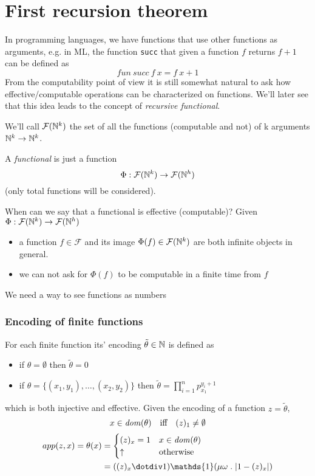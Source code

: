 \chapter{First recursion theorem}

In programming languages, we have functions that use other functions as arguments,
e.g. in ML, the function \texttt{succ} that
given a function $f$ returns $f+1$ can be defined as
\begin{equation*}
    fun\ succ\ f\ x = f\ x + 1
\end{equation*}
From the computability point of view it is still somewhat natural to ask
how effective/computable operations can be characterized on
functions. We'll later see that this idea leads to the concept of
\emph{recursive functional}.

\begin{definition}
  We'll call $\mathcal{F}(\mathbb{N}^k)$ the set of all the functions
  (computable and not) of k arguments $\mathbb{N}^k \to \mathbb{N}^k$.

A \emph{functional} is just a function
\[
  \Phi : \mathcal{F}(\mathbb{N}^k) \to \mathcal{F}(\mathbb{N}^h)
\]
(only total functions will be considered).
\end{definition}

When can we say that a functional is effective (computable)?
Given $\Phi : \mathcal{F}(\mathbb{N}^k) \to \mathcal{F}(\mathbb{N}^h)$
\begin{itemize}
\item a function $f \in \mathcal{F}$ and its image
  $\Phi(f) \in \mathcal{F}(\mathbb{N}^k)$ are both infinite objects in
  general.
\item we can not ask for $\Phi(f)$ to be computable in a finite time
  from $f$
\end{itemize}
We need a way to see functions as numbers
\subsection{Encoding of finite functions}
For each finite function its' encoding $\tilde{\theta} \in \mathbb{N}$ is defined
as
\begin{itemize}
\item if $\theta = \emptyset$ then $\tilde{\theta} = 0$
\item if $\theta = \{(x_1, y_1), \dots, (x_2, y_2)\}$ then
  $\tilde{\theta} = \prod_{i=1}^n p_{x_1}^{y_i+1}$
\end{itemize}
which is both injective and effective. Given the encoding of a function
$z= \tilde{\theta}$,
\[
  x \in \mathit{dom}({\theta}) \quad \mbox{iff} \quad (z)_1 \neq \emptyset
\]
\[
  \begin{aligned}
    app(z,x) = \theta(x) & = \begin{cases}
      (z)_x = 1 & x\in\dom{\theta} \\
      \uparrow & \mbox{otherwise}
    \end{cases} \\
    &= ((z)_x \dotdiv 1) \mathds{1}(\mu \omega \; . \; |1 - (z)_x|)
  \end{aligned}
\]

